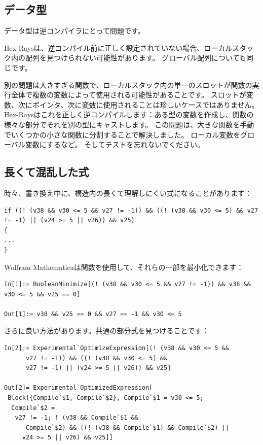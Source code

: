 \subsection{データ型}

データ型は逆コンパイラにとって問題です。

Hex-Raysは、逆コンパイル前に正しく設定されていない場合、ローカルスタック内の配列を見つけられない可能性があります。
グローバル配列についても同じです。

別の問題は大きすぎる関数で、ローカルスタック内の単一のスロットが関数の実行全体で複数の変数によって使用される可能性があることです。
スロットが変数、次にポインタ、次に変数に使用されることは珍しいケースではありません。
Hex-Raysはこれを正しく逆コンパイルします：ある型の変数を作成し、関数の様々な部分でそれを別の型にキャストします。
この問題は、大きな関数を手動でいくつかの小さな関数に分割することで解決しました。
ローカル変数をグローバル変数にするなど。
そしてテストを忘れないでください。

\subsection{長くて混乱した式}

時々、書き換え中に、構造内の長くて理解しにくい式になることがあります：

\begin{lstlisting}
if ((! (v38 && v30 <= 5 && v27 != -1)) && ((! (v38 && v30 <= 5) && v27 != -1) || (v24 >= 5 || v26)) && v25)
{
...
}
\end{lstlisting}

Wolfram Mathematicaは関数を使用して、それらの一部を最小化できます：

\begin{lstlisting}
In[1]:= BooleanMinimize[(! (v38 && v30 <= 5 && v27 != -1)) && v38 && v30 <= 5 && v25 == 0]

Out[1]:= v38 && v25 == 0 && v27 == -1 && v30 <= 5
\end{lstlisting}

さらに良い方法があります。共通の部分式を見つけることです：

\begin{lstlisting}
In[2]:= Experimental`OptimizeExpression[(! (v38 && v30 <= 5 && 
      v27 != -1)) && ((! (v38 && v30 <= 5) && 
      v27 != -1) || (v24 >= 5 || v26)) && v25]

Out[2]= Experimental`OptimizedExpression[
 Block[{Compile`$1, Compile`$2}, Compile`$1 = v30 <= 5; 
  Compile`$2 = 
   v27 != -1; ! (v38 && Compile`$1 && 
      Compile`$2) && ((! (v38 && Compile`$1) && Compile`$2) || 
     v24 >= 5 || v26) && v25]]
\end{lstlisting}

